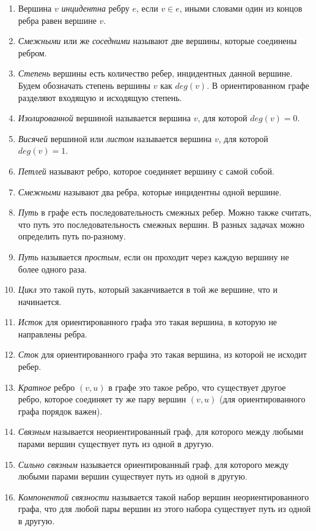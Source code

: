 \documentclass{article}
\begin{document}
\begin{enumerate}
\item Вершина $v$ \textit{инцидентна} ребру $e$, если $v \in e$, иными словами один из концов ребра равен вершине $v$.
\item \textit{Смежными} или же \textit{соседними} называют две вершины, которые соединены ребром. 
\item \textit{Степень} вершины есть количество ребер, инцидентных данной вершине. Будем обозначать степень вершины $v$ как $deg(v)$.
В ориентированном графе разделяют входящую и исходящую степень.
\item \textit{Изолированной} вершиной называется вершина $v$, для которой $deg(v) = 0$.
\item \textit{Висячей} вершиной или \textit{листом} называется вершина $v$, для которой $deg(v) = 1$.
\item \textit{Петлей} называют ребро, которое соединяет вершину с самой собой. 
\item \textit{Смежными} называют два ребра, которые инцидентны одной вершине. 
\item \textit{Путь} в графе есть последовательность смежных ребер. Можно также считать, что путь это 
последовательность смежных вершин. В разных задачах можно определить путь по-разному. 
\item \textit{Путь} называется \textit{простым}, если он проходит через каждую вершину не более одного раза.
\item \textit{Цикл} это такой путь, который заканчивается в той же вершине, что и начинается.
\item \textit{Исток} для ориентированного графа это такая вершина, в которую не направлены ребра.
\item \textit{Сток} для ориентированного графа это такая вершина, из которой не исходит ребер.
\item \textit{Кратное} ребро $(v,u)$ в графе это такое ребро, что существует другое ребро, которое соединяет ту же пару вершин $(v,u)$
(для ориентированного графа порядок важен).
\item \textit{Связным} называется неориентированный граф, для которого между любыми парами вершин существует путь из одной в другую.
\item \textit{Сильно связным} называется ориентированный граф, для которого между любыми парами вершин существует путь из одной в другую.
\item \textit{Компонентой связности} называется такой набор вершин неориентированного графа, что для любой пары вершин из этого набора существует путь из одной в другую.  
\end{enumerate}
\end{document}
